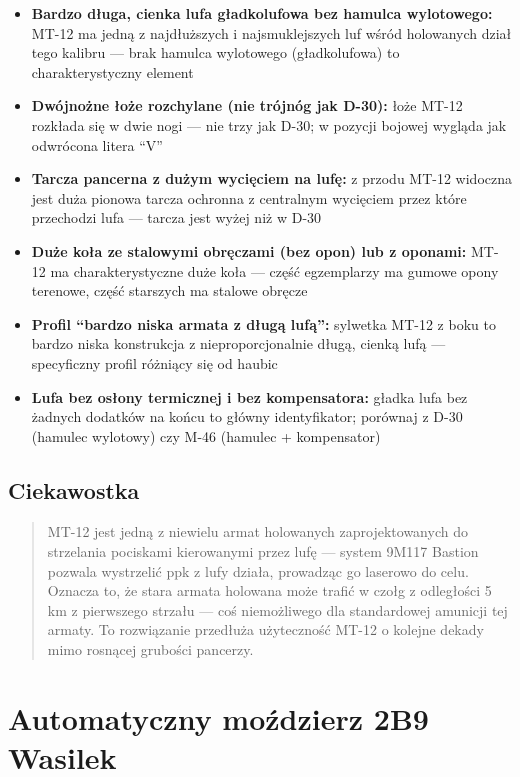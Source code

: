 \documentclass[12pt,openany,oneside]{book}
\providecommand{\tightlist}{%
  \setlength{\itemsep}{0pt}\setlength{\parskip}{0pt}}
\begin{document}
\begin{itemize}
\tightlist
\item
  \textbf{Bardzo długa, cienka lufa gładkolufowa bez hamulca
  wylotowego:} MT-12 ma jedną z najdłuższych i najsmuklejszych luf wśród
  holowanych dział tego kalibru --- brak hamulca wylotowego
  (gładkolufowa) to charakterystyczny element
\item
  \textbf{Dwójnożne łoże rozchylane (nie trójnóg jak D-30):} łoże MT-12
  rozkłada się w dwie nogi --- nie trzy jak D-30; w pozycji bojowej
  wygląda jak odwrócona litera ``V''
\item
  \textbf{Tarcza pancerna z dużym wycięciem na lufę:} z przodu MT-12
  widoczna jest duża pionowa tarcza ochronna z centralnym wycięciem
  przez które przechodzi lufa --- tarcza jest wyżej niż w D-30
\item
  \textbf{Duże koła ze stalowymi obręczami (bez opon) lub z oponami:}
  MT-12 ma charakterystyczne duże koła --- część egzemplarzy ma gumowe
  opony terenowe, część starszych ma stalowe obręcze
\item
  \textbf{Profil ``bardzo niska armata z długą lufą'':} sylwetka MT-12 z
  boku to bardzo niska konstrukcja z nieproporcjonalnie długą, cienką
  lufą --- specyficzny profil różniący się od haubic
\item
  \textbf{Lufa bez osłony termicznej i bez kompensatora:} gładka lufa
  bez żadnych dodatków na końcu to główny identyfikator; porównaj z D-30
  (hamulec wylotowy) czy M-46 (hamulec + kompensator)
\end{itemize}

\section{Ciekawostka}\label{ciekawostka-23}

\begin{quote}
MT-12 jest jedną z niewielu armat holowanych zaprojektowanych do
strzelania pociskami kierowanymi przez lufę --- system 9M117 Bastion
pozwala wystrzelić ppk z lufy działa, prowadząc go laserowo do celu.
Oznacza to, że stara armata holowana może trafić w czołg z odległości 5
km z pierwszego strzału --- coś niemożliwego dla standardowej amunicji
tej armaty. To rozwiązanie przedłuża użyteczność MT-12 o kolejne dekady
mimo rosnącej grubości pancerzy.
\end{quote}

\chapter{Automatyczny moździerz 2B9
Wasilek}\label{automatyczny-moux17adzierz-2b9-wasilek}
\end{document}
